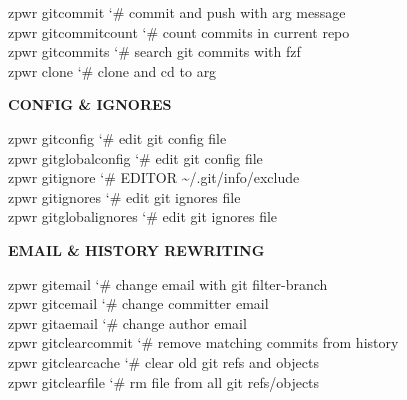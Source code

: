 \documentclass[11pt,a4paper,twoside]{book}
\begin{document}
\begin{codebox}
\color{neongreen}zpwr gitcommit             {\char`\#} commit and push with arg message\\
\color{neongreen}zpwr gitcommitcount        {\char`\#} count commits in current repo\\
\color{neongreen}zpwr gitcommits            {\char`\#} search git commits with fzf\\
\color{neongreen}zpwr clone                 {\char`\#} clone and cd to arg\\
\end{codebox}


\vspace{12pt}
{\bfseries\color{neonyellow} CONFIG \& IGNORES}\vspace{4pt}

\begin{codebox}
\color{neongreen}zpwr gitconfig             {\char`\#} edit git config file\\
\color{neongreen}zpwr gitglobalconfig       {\char`\#} edit git config file\\
\color{neongreen}zpwr gitignore             {\char`\#} EDITOR \textasciitilde{}/.git/info/exclude\\
\color{neongreen}zpwr gitignores            {\char`\#} edit git ignores file\\
\color{neongreen}zpwr gitglobalignores      {\char`\#} edit git ignores file\\
\end{codebox}


\vspace{12pt}
{\bfseries\color{neonyellow} EMAIL \& HISTORY REWRITING}\vspace{4pt}

\begin{codebox}
\color{neongreen}zpwr gitemail              {\char`\#} change email with git filter-branch\\
\color{neongreen}zpwr gitcemail             {\char`\#} change committer email\\
\color{neongreen}zpwr gitaemail             {\char`\#} change author email\\
\color{neongreen}zpwr gitclearcommit        {\char`\#} remove matching commits from history\\
\color{neongreen}zpwr gitclearcache         {\char`\#} clear old git refs and objects\\
\color{neongreen}zpwr gitclearfile          {\char`\#} rm file from all git refs/objects\\
\end{codebox}
\end{document}
